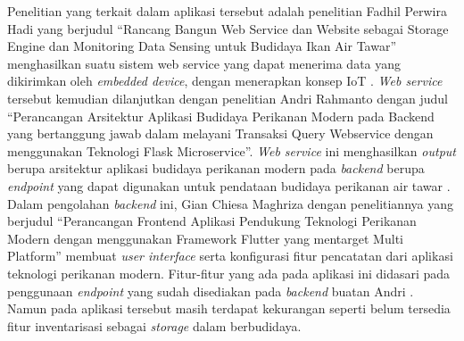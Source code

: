 \begin{spacing}{1.5}
Penelitian yang terkait dalam aplikasi tersebut adalah penelitian Fadhil Perwira Hadi yang berjudul “Rancang Bangun Web Service dan Website sebagai Storage Engine dan Monitoring Data Sensing untuk Budidaya Ikan Air Tawar” menghasilkan suatu sistem web service yang dapat menerima data yang dikirimkan oleh \textit{embedded device}, dengan menerapkan konsep IoT \citep{fadhil2021}. \textit{Web service} tersebut kemudian dilanjutkan dengan penelitian Andri Rahmanto dengan judul “Perancangan Arsitektur Aplikasi Budidaya Perikanan Modern pada Backend yang bertanggung jawab dalam melayani Transaksi Query Webservice dengan menggunakan Teknologi Flask Microservice”. \textit{Web service} ini menghasilkan \textit{output} berupa arsitektur aplikasi budidaya perikanan modern pada \textit{backend} berupa \textit{endpoint} yang dapat digunakan untuk pendataan budidaya perikanan air tawar \citep{andri2022}. Dalam pengolahan \textit{backend} ini, Gian Chiesa Maghriza dengan penelitiannya yang berjudul “Perancangan Frontend Aplikasi Pendukung Teknologi Perikanan Modern dengan menggunakan Framework Flutter yang mentarget Multi Platform” membuat \textit{user interface} serta konfigurasi fitur pencatatan dari aplikasi teknologi perikanan modern. Fitur-fitur yang ada pada aplikasi ini didasari pada penggunaan \textit{endpoint} yang sudah disediakan pada \textit{backend} buatan Andri \citep{gian2022}. Namun pada aplikasi tersebut masih terdapat kekurangan seperti belum tersedia fitur inventarisasi sebagai \textit{storage} dalam berbudidaya.



\end{spacing}
